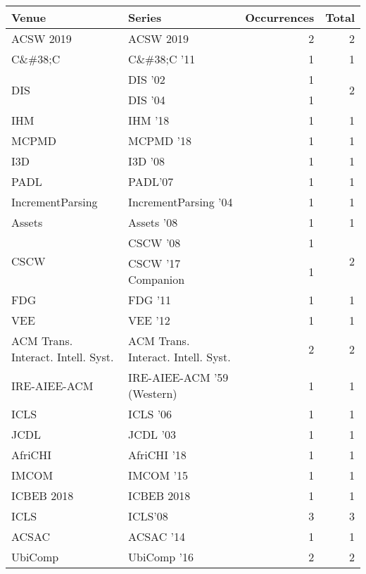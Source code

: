 \begin{table*}[t]
\begin{tabular}{llrr}
Venue & Series & Occurrences & Total\\\hline
\multirow{1}{*}{ACSW 2019} & ACSW 2019 & 2 & \multirow{1}{*}{2}\\
\multirow{1}{*}{C\&\#38;C } & C\&\#38;C '11 & 1 & \multirow{1}{*}{1}\\
\multirow{2}{*}{DIS } & DIS '02 & 1 & \multirow{2}{*}{2}\\
& DIS '04 & 1 &\\
\multirow{1}{*}{IHM } & IHM '18 & 1 & \multirow{1}{*}{1}\\
\multirow{1}{*}{MCPMD } & MCPMD '18 & 1 & \multirow{1}{*}{1}\\
\multirow{1}{*}{I3D } & I3D '08 & 1 & \multirow{1}{*}{1}\\
\multirow{1}{*}{PADL} & PADL'07 & 1 & \multirow{1}{*}{1}\\
\multirow{1}{*}{IncrementParsing } & IncrementParsing '04 & 1 & \multirow{1}{*}{1}\\
\multirow{1}{*}{Assets } & Assets '08 & 1 & \multirow{1}{*}{1}\\
\multirow{2}{*}{CSCW } & CSCW '08 & 1 & \multirow{2}{*}{2}\\
& CSCW '17 Companion & 1 &\\
\multirow{1}{*}{FDG } & FDG '11 & 1 & \multirow{1}{*}{1}\\
\multirow{1}{*}{VEE } & VEE '12 & 1 & \multirow{1}{*}{1}\\
\multirow{1}{*}{ACM Trans. Interact. Intell. Syst.} & ACM Trans. Interact. Intell. Syst. & 2 & \multirow{1}{*}{2}\\
\multirow{1}{*}{IRE-AIEE-ACM } & IRE-AIEE-ACM '59 (Western) & 1 & \multirow{1}{*}{1}\\
\multirow{1}{*}{ICLS } & ICLS '06 & 1 & \multirow{1}{*}{1}\\
\multirow{1}{*}{JCDL } & JCDL '03 & 1 & \multirow{1}{*}{1}\\
\multirow{1}{*}{AfriCHI } & AfriCHI '18 & 1 & \multirow{1}{*}{1}\\
\multirow{1}{*}{IMCOM } & IMCOM '15 & 1 & \multirow{1}{*}{1}\\
\multirow{1}{*}{ICBEB 2018} & ICBEB 2018 & 1 & \multirow{1}{*}{1}\\
\multirow{1}{*}{ICLS} & ICLS'08 & 3 & \multirow{1}{*}{3}\\
\multirow{1}{*}{ACSAC } & ACSAC '14 & 1 & \multirow{1}{*}{1}\\
\multirow{1}{*}{UbiComp } & UbiComp '16 & 2 & \multirow{1}{*}{2}\\

\end{tabular}
\end{table*}
